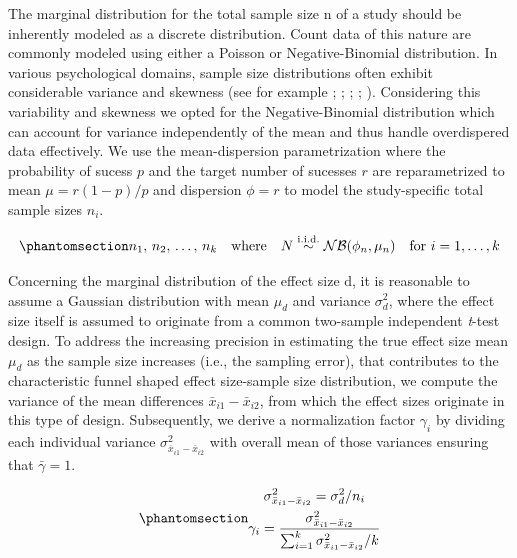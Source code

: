 \documentclass[
  12pt,
]{scrartcl}
\begin{document}
The marginal distribution for the total sample size \(\mathrm{n}\) of a
study should be inherently modeled as a discrete distribution. Count
data of this nature are commonly modeled using either a Poisson or
Negative-Binomial distribution. In various psychological domains, sample
size distributions often exhibit considerable variance and skewness (see
for example ; ;
;
;
).
Considering this variability and skewness we opted for the
Negative-Binomial distribution which can account for variance
independently of the mean and thus handle overdispered data effectively.
We use the mean-dispersion parametrization where the probability of
sucess \(p\) and the target number of sucesses \(r\) are reparametrized
to mean \(\mu = r(1-p)/p\) and dispersion \(\phi=r\) to model the
study-specific total sample sizes \(n_i\).

\begin{equation}\phantomsection\label{eq-nb-dist}{
n_1, \,n_2,\, \ldots, \,n_k \quad \text{where} \quad N\stackrel{\mathrm{i.i.d.}}{\sim} \mathcal{NB}(\phi_n, \mu_n) \quad \text{for } i = 1, \ldots, k
}\end{equation}

Concerning the marginal distribution of the effect size \(\mathrm{d}\),
it is reasonable to assume a Gaussian distribution with mean \(\mu_d\)
and variance \(\sigma^2_d\), where the effect size itself is assumed to
originate from a common two-sample independent \emph{t}-test design. To
address the increasing precision in estimating the true effect size mean
\(\mu_d\) as the sample size increases (i.e., the sampling error), that
contributes to the characteristic funnel shaped effect size-sample size
distribution, we compute the variance of the mean differences
\(\bar{x}_{i1} - \bar{x}_{i2}\), from which the effect sizes originate
in this type of design. Subsequently, we derive a normalization factor
\(\gamma_i\) by dividing each individual variance
\(\sigma^2_{\bar{x}_{i1} - \bar{x}_{i2}}\) with overall mean of those
variances ensuring that \(\bar{\gamma}=1\).

\begin{equation}\phantomsection\label{eq-normalization}{
\begin{gathered}
\sigma^2_{\bar{x}_{i1} - \bar{x}_{i2}}=\sigma_d^2/n_i \\
\gamma_i=\frac{\sigma^2_{\bar{x}_{i1} - \bar{x}_{i2}}}{\sum_{i=1}^{k}\sigma^2_{\bar{x}_{i1} - \bar{x}_{i2}}/k} \\
\end{gathered}
}\end{equation}
\end{document}
